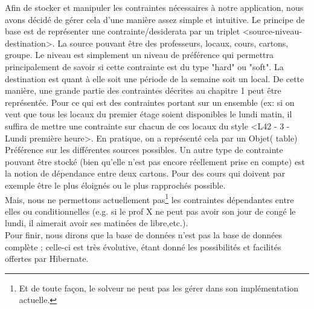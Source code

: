 \newline
\indent
Afin de stocker et manipuler les contraintes nécessaires à notre application, nous avons décidé de gérer cela d'une manière assez simple et intuitive. 
Le principe de base est de représenter une contrainte/desiderata par un triplet <source-niveau-destination>.  
\newline
\indent
La source pouvant être des professeurs, locaux, cours, cartons, groupe. Le niveau est simplement un niveau de préférence qui permettra principalement de savoir si cette contrainte est du type "hard" ou "soft".  La destination est quant à elle soit une période de la semaine soit un local.  De cette manière, une grande partie des contraintes décrites au chapitre 1 peut être représentée.
\newline
\indent
    Pour ce qui est des contraintes portant sur un ensemble (ex: si on veut que tous les locaux du premier étage soient disponibles le lundi matin, il suffira de mettre une contrainte sur chacun de ces locaux du style <L42 - 3 - Lundi première heure>.  En pratique, on a représenté cela par un Objet( table) Préférence sur les différentes sources possibles.
   \newline
   \indent
Un autre type de contrainte pouvant être stocké (bien qu'elle n'est pas encore réellement prise en compte) est la notion de dépendance entre deux cartons.  Pour des cours qui doivent par exemple être le plus éloignés ou le plus rapprochés possible.\\
\newline
\indent
Mais, nous ne permettons actuellement pas\footnote{Et de toute façon, le solveur ne peut pas les gérer dans son implémentation actuelle.} les contraintes dépendantes entre elles ou conditionnelles (e.g. si le prof X ne peut pas avoir son jour de congé le lundi, il aimerait avoir ses matinées de libre,etc.).\\
\newline
\indent
Pour finir, nous dirons que la base de données n'est pas la base de données complète ; celle-ci est très évolutive, étant donné les possibilités et facilités offertes par Hibernate.
